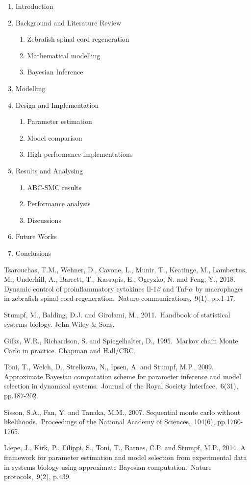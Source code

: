 \documentclass{article}
\begin{document}
\begin{enumerate}
	\item Introduction
	\item Background and Literature Review
	\begin{enumerate}
		\item Zebrafish spinal cord regeneration
		\item Mathematical modelling
		\item Bayesian Inference
	\end{enumerate}
	\item Modelling
	\item Design and Implementation
	\begin{enumerate}
		\item Parameter estimation
		\item Model comparison
		\item High-performance implementations
	\end{enumerate}
	\item Results and Analysing
	\begin{enumerate}
		\item ABC-SMC results
		\item Performance analysis
		\item Discussions
	\end{enumerate}
	\item Future Works
	\item Conclusions
\end{enumerate}

\pagebreak
\begin{thebibliography}{100}

 Tsarouchas, T.M., Wehner, D., Cavone, L., Munir, T., Keatinge, M., Lambertus, M., Underhill, A., Barrett, T., Kassapis, E., Ogryzko, N. and Feng, Y., 
2018. Dynamic control of proinflammatory cytokines Il-1$\beta$ and Tnf-$\alpha$ by macrophages in zebrafish spinal cord regeneration. Nature communications, 9(1), pp.1-17.

Stumpf, M., Balding, D.J. and Girolami, M., 
2011. Handbook of statistical systems biology. John Wiley \& Sons.

Gilks, W.R., Richardson, S. and Spiegelhalter, D., 
1995. Markov chain Monte Carlo in practice. Chapman and Hall/CRC.

Toni, T., Welch, D., Strelkowa, N., Ipsen, A. and Stumpf, M.P., 
2009. Approximate Bayesian computation scheme for parameter inference and model selection in dynamical systems. Journal of the Royal Society Interface, 6(31), pp.187-202.

Sisson, S.A., Fan, Y. and Tanaka, M.M., 
2007. Sequential monte carlo without likelihoods. Proceedings of the National Academy of Sciences, 104(6), pp.1760-1765.

Liepe, J., Kirk, P., Filippi, S., Toni, T., Barnes, C.P. and Stumpf, M.P., 
2014. A framework for parameter estimation and model selection from experimental data in systems biology using approximate Bayesian computation. Nature protocols, 9(2), p.439.


\end{thebibliography}
\end{document}
